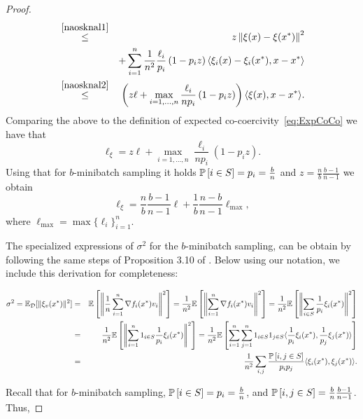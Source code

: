 \documentclass{article}
\begin{document}
\begin{proof}
\begin{eqnarray}
& \overset{\eqref{naosknal1}}{\leq} &  z \left\| \xi(x) - \xi(x^*)\right\|^2 \notag\\
& &+  \sum_{i=1}^n\frac{1}{n^2} \frac{\ell_i }{p_i}\left(1 -p_i z \right) \langle\xi_i(x)-\xi_i(x^*),x-x^*\rangle \notag\\
& \overset{\eqref{naosknal2}}{\leq} & \left(z \ell +\max_{i=1,\ldots, n}\frac{\ell_i}{np_i}\left(1 -p_i z \right)  \right) \langle\xi(x),x-x^*\rangle.
\end{eqnarray}
Comparing the above to the definition of expected co-coercivity~\eqref{eq:ExpCoCo} we have that
\begin{equation} \label{eq:CLinterpolc2}
\ell_{\xi} =  z \ell +\max_{i=1,\ldots, n}\frac{\ell_i}{np_i}\left(1 -p_i z \right).
\end{equation}
Using that for  $b$-minibatch sampling it holds $\mathbb{P} \left[ i\in S\right] = p_i = \frac{b}{n}$ and  $z =\frac{n}{b}\frac{b-1}{n-1}$ we obtain
$$\ell_\xi = \frac{n}{b}\frac{b-1}{n-1}\ell+\frac{1}{b}\frac{n-b}{n-1} \ell_{\max},$$ 
where $\ell_{\max}=\max \{\ell_i\}_{i=1}^n$.

The specialized expressions of $\sigma^2$ for the $b$-minibatch sampling, can be obtain by following the same steps of Proposition 3.10 of \cite{gower2019sgd}. Below using our notation, we include this derivation for completeness:

\begin{eqnarray*}
		\sigma^2 = \mathbb{E}_{{\cal D}}[\|\xi_v(x^*) \|^2] &=& \mathbb{E}\left[ \left\| \frac{1}{n}\sum_{i=1}^n\nabla f_i(x^*)v_i \right\|^2\right] = \frac{1}{n^2}\mathbb{E}\left[\left\| \sum_{i=1}^n \nabla f_i(x^*)v_i \right\|^2\right]= \frac{1}{n^2} \mathbb{E} \left[\left\| \sum_{i\in {S}} \frac{1}{p_i}\xi_i(x^*) \right\|^2\right] \\
		&=& \frac{1}{n^2} \mathbb{E} \left[ \left\| \sum_{i=1}^n 1_{i \in { S}}\frac{1}{p_i}\xi_i(x^*)\right\|^2 \right] = \frac{1}{n^2} \mathbb{E} \left[\sum_{i=1}^n \sum_{j=1}^n 1_{i \in { S}} 1_{j \in { S}} \langle \frac{1}{p_i}\xi_i(x^*), \frac{1}{p_j}\xi_j(x^*) \rangle \right]\\
		&=& \frac{1}{n^2}\sum_{i,j}\frac{\mathbb{P} \left[ i,j \in S\right]}{p_ip_j} \langle \xi_i(x^*), \xi_j(x^*) \rangle .
	\end{eqnarray*}
	
Recall that for $b$-minibatch sampling, $\mathbb{P} \left[ i\in S\right] = p_i = \frac{b}{n}$, and  $\mathbb{P} \left[ i,j\in S\right] = \frac{b}{n}\frac{b-1}{n-1} $. Thus,


\end{proof}
\end{document}
